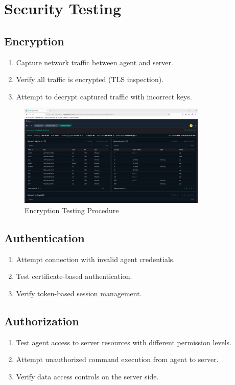 \section{Security Testing}
\subsection{Encryption}
\begin{enumerate}
    \item Capture network traffic between agent and server.
    \item Verify all traffic is encrypted (TLS inspection).
    \item Attempt to decrypt captured traffic with incorrect keys.
\end{enumerate}

\begin{figure}[h]
    \centering
    \includegraphics[width=0.8\textwidth]{openarmor-agent/6.png}
    \caption{Encryption Testing Procedure}
    \label{fig:encryption-testing}
\end{figure}

\subsection{Authentication}
\begin{enumerate}
    \item Attempt connection with invalid agent credentials.
    \item Test certificate-based authentication.
    \item Verify token-based session management.
\end{enumerate}

\subsection{Authorization}
\begin{enumerate}
    \item Test agent access to server resources with different permission levels.
    \item Attempt unauthorized command execution from agent to server.
    \item Verify data access controls on the server side.
\end{enumerate}

